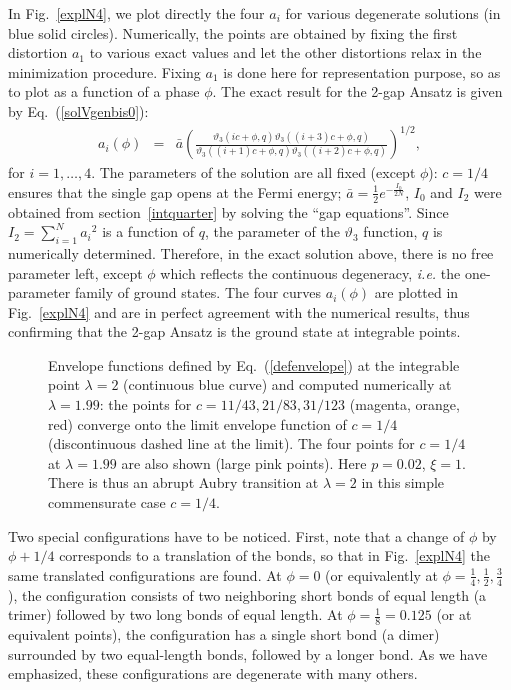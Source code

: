 \documentclass[]{revtex4-1}
\begin{document}
In Fig.~\ref{explN4}, we plot directly the four $a_i$ for various degenerate solutions (in blue solid circles). Numerically, the points are obtained by fixing the first distortion $a_1$ to various exact values and let the other distortions relax in the minimization procedure. Fixing $a_1$ is done here for representation purpose, so as to plot as a function of a phase $\phi$. The exact result for the 2-gap Ansatz is given by Eq.~(\ref{solVgenbis0}):
\begin{eqnarray}
  a_{i}(\phi) &=& \bar{a} \left(  \frac{\vartheta_3(ic+\phi,q) \vartheta_3((i+3)c+\phi,q) }{\vartheta_3((i+1)c+\phi,q)\vartheta_3((i+2)c+\phi,q)} \right)^{1/2}, \label{solVgenbis} 
\end{eqnarray}
for $i=1,\dots,4$. The parameters of the solution  are all fixed (except $\phi$):  $c=1/4$ ensures that the single gap opens at the Fermi energy; $\bar{a}=\frac{1}{2} e^{-\frac{I_0}{2N}}$,  $I_0$ and $I_2$  were obtained from section~\ref{intquarter} by solving the ``gap equations''.
Since $I_2=\sum_{i=1}^{N} {a_i}^2$ is a function of $q$, the parameter of the $\vartheta_3$ function,  $q$ is numerically determined. 
Therefore, in the exact solution above, there is no free parameter left, except $\phi$ which reflects the continuous degeneracy, \textit{i.e.} the one-parameter family of ground states. The four curves $a_i(\phi)$ are plotted in Fig.~\ref{explN4} and are in perfect agreement with the numerical results, thus confirming that the 2-gap Ansatz is the ground state at integrable points.


\begin{figure}[h]
 \begin{center}  
 \end{center} \caption{Envelope functions defined by Eq.~(\ref{defenvelope}) at the integrable point $\lambda=2$ (continuous blue curve) and computed numerically at $\lambda=1.99$: the points for $c=11/43,21/83,31/123$ (magenta, orange, red) converge onto the limit envelope function of $c=1/4$ (discontinuous dashed line at the limit). The four points for $c=1/4$ at $\lambda=1.99$ are also shown (large pink points). Here $p=0.02$, $\xi=1$. There is thus an abrupt Aubry transition at $\lambda=2$ in this simple commensurate case $c=1/4$.}
     \label{envelope}
\end{figure}

Two special configurations have to be noticed. First, note that a change of $\phi$ by $\phi+ 1/4$ corresponds to a translation of the bonds, so that in Fig.~\ref{explN4} the same translated configurations are found. At $\phi = 0$ (or equivalently at $\phi=\frac{1}{4},\frac{1}{2},\frac{3}{4}$), the configuration consists of two neighboring short bonds of equal length (a trimer) followed by two long bonds of equal length. At $\phi=\frac{1}{8}=0.125$ (or at equivalent points), the configuration has a single short bond (a dimer) surrounded by two equal-length bonds, followed by a longer bond. As we have emphasized, these configurations are degenerate with many others.
\end{document}
